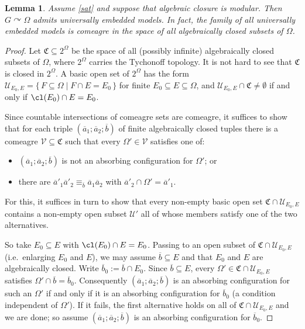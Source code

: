 \documentclass{article}
\newtheorem{lemma}[theorem]{Lemma}
\theoremstyle{remark}
\theoremstyle{definition}
\def\acts{\curvearrowright}
\newcommand{\U}[0]{\mathbb{U}}
\renewcommand{\U}[0]{\mathcal{U}}
\newcommand{\V}[0]{\mathcal{V}}
\begin{document}
{{{{{ \begin{lemma}\label{from base monotonicity to universally embedded}
   Assume \ref{sat} and suppose {that algebraic closure is modular.} 
   Then $G\acts\Omega$ admits universally embedded models. In fact, the family of all universally embedded models is comeagre in the space of all algebraically closed subsets of $\Omega$. 
  \end{lemma}
  \begin{proof}
  	Let $\mathfrak{C}\subseteq 2^{\Omega}$ 
    be the space of all (possibly infinite) algebraically closed subsets of $\Omega$,
    {where $2^{\Omega}$ carries the Tychonoff 
    topology.}
    It is not hard to see that   $\mathfrak{C}$ is closed in $2^{\Omega}$. A basic open set of $2^\Omega$ has  the form
  $\U_{E_0, E} = \{\, F \subseteq \Omega \mid F \cap E = E_0 \,\}$ for finite   $E_0 \subseteq E \subseteq \Omega$, and $\U_{E_0, E} \cap \mathfrak{C} \neq \emptyset$ if and only if  $\cl(E_0) \cap E = E_0$. %

     Since countable intersections of comeagre sets are comeagre, it suffices to   show that for each triple $(\overline{a}_1; \overline{a}_2; \overline{b})$  of finite algebraically closed tuples there is a comeagre   $\V \subseteq \mathfrak{C}$ such that every $\Omega' \in \V$ satisfies one   of:
  \begin{itemize}
    \item $(\overline{a}_1; \overline{a}_2; \overline{b})$ is not an absorbing
      configuration for $\Omega'$; or
    \item there are $\overline{a}'_1 \overline{a}'_2 \equiv_{\overline{b}}
      \overline{a}_1 \overline{a}_2$ with
      $\overline{a}'_2 \cap \Omega' = \overline{a}'_1$.
  \end{itemize}

     {  For this, it suffices in turn to show that every non-empty basic open set
  $\mathfrak{C} \cap \U_{E_0, E}$ contains a non-empty open subset $\U'$ all
  of whose members satisfy one of the two alternatives.}

  So take $E_0 \subseteq E$ with $\cl(E_0) \cap E = E_0$. Passing to an open   subset of $\mathfrak{C} \cap \U_{E_0, E}$ (i.e.\ enlarging $E_0$ and $E$),   we may assume $\overline{b} \subseteq E$ and that $E_0$ and $E$ are algebraically closed. Write $\overline{b}_0 := \overline{b} \cap E_0$. Since   $\overline{b} \subseteq E$, every
  $\Omega' \in \mathfrak{C} \cap \U_{E_0, E}$ satisfies
  $\Omega' \cap \overline{b} = \overline{b}_0$. 
  Consequently $(\overline{a}_1; \overline{a}_2; \overline{b})$ is an absorbing   configuration for such an $\Omega'$ if and only if it is an absorbing configuration for
  $\overline{b}_0$ (a condition independent of $\Omega'$). 
  If it fails, the  first alternative holds on all of $\mathfrak{C} \cap \U_{E_0, E}$ and we are  done; so assume $(\overline{a}_1; \overline{a}_2; \overline{b})$ is an  absorbing configuration for $\overline{b}_0$.
    

\end{proof}}}}}}
\end{document}
